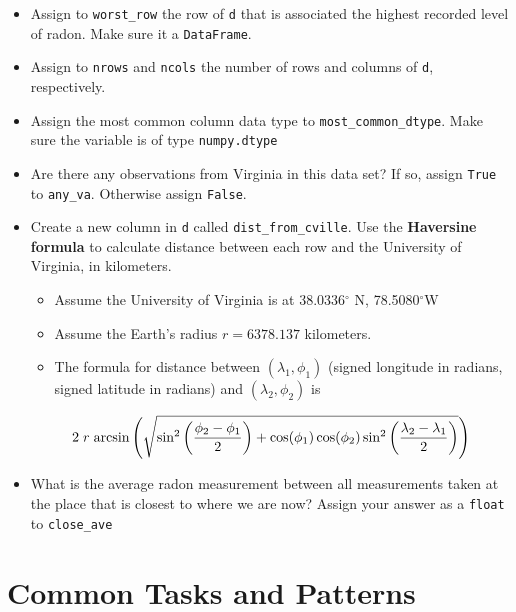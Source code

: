 \documentclass[12pt,krantz2]{krantz}
\providecommand{\tightlist}{%
  \setlength{\itemsep}{0pt}\setlength{\parskip}{0pt}}
\begin{document}
\begin{itemize}
\tightlist
\item
  Assign to \texttt{worst\_row} the row of \texttt{d} that is associated the highest recorded level of radon. Make sure it a \texttt{DataFrame}.
\item
  Assign to \texttt{nrows} and \texttt{ncols} the number of rows and columns of \texttt{d}, respectively.
\item
  Assign the most common column data type to \texttt{most\_common\_dtype}. Make sure the variable is of type \texttt{numpy.dtype}
\item
  Are there any observations from Virginia in this data set? If so, assign \texttt{True} to \texttt{any\_va}. Otherwise assign \texttt{False}.
\item
  Create a new column in \texttt{d} called \texttt{dist\_from\_cville}. Use the \textbf{Haversine formula} to calculate distance between each row and the University of Virginia, in kilometers.

  \begin{itemize}
  \tightlist
  \item
    Assume the University of Virginia is at 38.0336\(^\circ\) N, 78.5080\(^\circ\)W
  \item
    Assume the Earth's radius \(r = 6378.137\) kilometers.
  \item
    The formula for distance between \((\lambda_1, \phi_1)\) (signed longitude in radians, signed latitude in radians) and \((\lambda_2, \phi_2)\) is
  \end{itemize}

  \begin{equation}
  2 \hspace{1mm} r \hspace{1mm} \text{arcsin}\left( \sqrt{ \sin^2\left( \frac{\phi_2 - \phi_1}{2}\right)  + \cos(\phi_1)\cos(\phi_2) \sin^2\left( \frac{\lambda_2 - \lambda_1}{2} \right)  } \right)
  \end{equation}
\item
  What is the average radon measurement between all measurements taken at the place that is closest to where we are now? Assign your answer as a \texttt{float} to \texttt{close\_ave}
\end{itemize}

\hypertarget{part-common-tasks-and-patterns}{%
\part{Common Tasks and Patterns}\label{part-common-tasks-and-patterns}}
\end{document}
